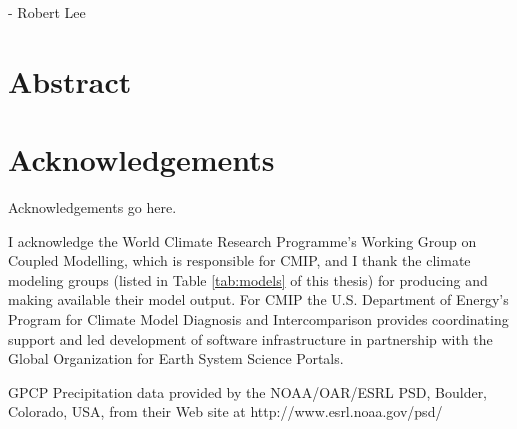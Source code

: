 \vspace*{2cm}
- Robert Lee %

\newpage
\thispagestyle{empty}


\chapter*{\centering \Large \vspace{-20mm}\Huge Abstract}
\thispagestyle{headings}


\chapter*{\centering \Large \vspace{-20mm}\Huge Acknowledgements}
\thispagestyle{headings}

Acknowledgements go here.


I acknowledge the World Climate Research Programme's Working Group on Coupled Modelling, which is responsible for CMIP, and I thank the climate modeling groups (listed in Table \ref{tab:models} of this thesis) for producing and making available their model output. For CMIP the U.S. Department of Energy's Program for Climate Model Diagnosis and Intercomparison provides coordinating support and led development of software infrastructure in partnership with the Global Organization for Earth System Science Portals.

GPCP Precipitation data provided by the NOAA/OAR/ESRL PSD, Boulder, Colorado, USA, from their Web site at http://www.esrl.noaa.gov/psd/


\vspace{2cm}


\newpage
\thispagestyle{empty}

\tableofcontents

